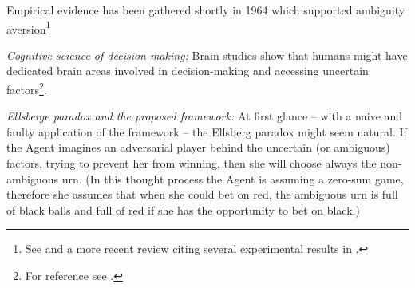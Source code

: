 \documentclass{article}
\begin{document}
Empirical evidence has been gathered shortly in 1964 which supported ambiguity aversion\footnote{See \cite{paper:EmpiricalEllsbergBecker1964} and a more recent review citing several experimental results in \cite{paper:ExperimentalEllsbergReviewCamerer1992}.}


{\it Cognitive science of decision making:}
Brain studies show that humans might have dedicated brain areas involved in decision-making and accessing uncertain factors\footnote{For reference see \cite{thesis:NeuralDecisionMaking,paper:NeuroeconomicsOfDecisionMaking}.}.

{\it Ellsberge paradox and the proposed framework:}
At first glance -- with a naive and faulty application of the framework -- the Ellsberg paradox might seem natural. If the Agent imagines an adversarial player behind the uncertain (or ambiguous) factors, trying to prevent her from winning, then she will choose always the non-ambiguous urn. (In this thought process the Agent is assuming a zero-sum game, therefore she assumes that when she could bet on red, the ambiguous urn is full of black balls and full of red if she has the opportunity to bet on black.)
\end{document}
